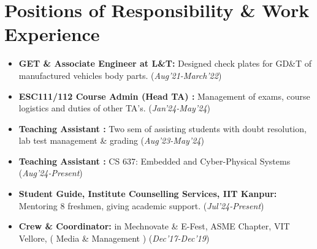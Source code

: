 \documentclass[10.8pt, a4paper]{extarticle}
\newcommand{\shorterSection}[1]{\vspace{-10pt}\section{#1}}
\begin{document}
\shorterSection{Positions of Responsibility \& Work Experience}
\begin{itemize}

\item \textbf{GET \& Associate Engineer at L\&T:} Designed check plates for GD\&T of manufactured 
 vehicles body parts. 
\href{https://drive.google.com/file/d/1OrfxyGyHMvoRFeCne3UPIx8iQgQaKPqk/view?usp=sharing}{\faLink{}} \href{https://drive.google.com/file/d/1JMF9GNNZ7MU2pVo0j9vEk110BOJtHZgV/view?usp=sharing}{\faLink{}}  \hfill\hfill(\textit{Aug'21-March'22})  \\[-0.6cm]

\item \textbf{ESC111/112 Course Admin (Head TA) :} Management of exams, course logistics and duties of other TA's. \hfill\hfill(\textit{Jan'24-May'24})  \\[-0.6cm]

\item \textbf{Teaching Assistant :} Two sem of assisting students with doubt resolution, lab test management \& grading \hfill\hfill(\textit{Aug'23-May'24})  \\[-0.6cm]

\item \textbf{Teaching Assistant :} CS 637: Embedded and Cyber-Physical Systems \hfill\hfill(\textit{Aug'24-Present})  \\[-0.6cm]

\item \textbf{Student Guide, Institute Counselling Services, IIT Kanpur:} Mentoring 8 freshmen, giving academic support. \hfill\hfill(\textit{Jul'24-Present})\\[-0.6cm]

\item \textbf{Crew \& Coordinator: }in Mechnovate \& E-Fest, ASME Chapter, VIT Vellore, ( Media \& Management ) 
\href{https://drive.google.com/file/d/1skeeRg3UISDUtRxwI7Nfen7c6zbsuysX/view?usp=sharing}{\faLink{}} \hfill\hfill(\textit{Dec'17-Dec'19}) 

\vspace{2mm}
\end{itemize}


\end{document}
